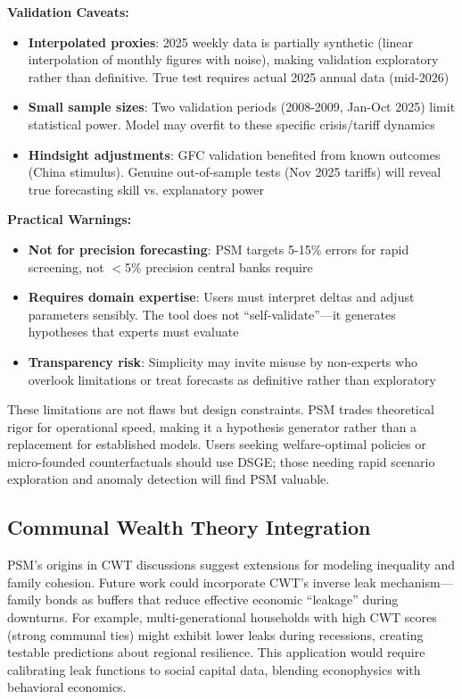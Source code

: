 \documentclass[11pt]{article}
\begin{document}
\textbf{Validation Caveats:}
\begin{itemize}
\item \textbf{Interpolated proxies}: 2025 weekly data is partially synthetic (linear interpolation of monthly figures with noise), making validation exploratory rather than definitive. True test requires actual 2025 annual data (mid-2026)
\item \textbf{Small sample sizes}: Two validation periods (2008-2009, Jan-Oct 2025) limit statistical power. Model may overfit to these specific crisis/tariff dynamics
\item \textbf{Hindsight adjustments}: GFC validation benefited from known outcomes (China stimulus). Genuine out-of-sample tests (Nov 2025 tariffs) will reveal true forecasting skill vs. explanatory power
\end{itemize}

\textbf{Practical Warnings:}
\begin{itemize}
\item \textbf{Not for precision forecasting}: PSM targets 5-15\% errors for rapid screening, not $<$5\% precision central banks require
\item \textbf{Requires domain expertise}: Users must interpret deltas and adjust parameters sensibly. The tool does not ``self-validate''---it generates hypotheses that experts must evaluate
\item \textbf{Transparency risk}: Simplicity may invite misuse by non-experts who overlook limitations or treat forecasts as definitive rather than exploratory
\end{itemize}

These limitations are not flaws but design constraints. PSM trades theoretical rigor for operational speed, making it a hypothesis generator rather than a replacement for established models. Users seeking welfare-optimal policies or micro-founded counterfactuals should use DSGE; those needing rapid scenario exploration and anomaly detection will find PSM valuable.

\subsection{Communal Wealth Theory Integration}
PSM's origins in CWT discussions suggest extensions for modeling inequality and family cohesion. Future work could incorporate CWT's inverse leak mechanism---family bonds as buffers that reduce effective economic ``leakage'' during downturns. For example, multi-generational households with high CWT scores (strong communal ties) might exhibit lower leaks during recessions, creating testable predictions about regional resilience. This application would require calibrating leak functions to social capital data, blending econophysics with behavioral economics.
\end{document}
